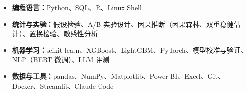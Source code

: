 \begin{itemize}
  \item \textbf{编程语言：}Python、SQL、R、Linux Shell
  \item \textbf{统计与实验：}假设检验、A/B 实验设计、因果推断（因果森林、双重稳健估计）、置换检验、敏感性分析
  \item \textbf{机器学习：}scikit-learn、XGBoost、LightGBM、PyTorch、模型校准与验证、NLP（BERT 微调）、LLM 评测
  \item \textbf{数据与工具：}pandas、NumPy、Matplotlib、Power BI、Excel、Git、Docker、Streamlit、Claude Code
\end{itemize}

